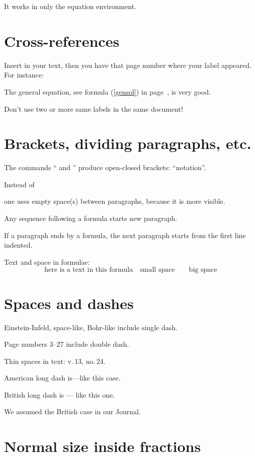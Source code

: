 \documentclass[12pt]{article}
\begin{document}
It works in only the {equation} environment.

\section*{Cross-references}

Insert \label{myidea} in your text, then you have that page number where your label \pageref{myidea} appeared. For instance:

The general equation, see formula (\ref{gensol}) in page~\pageref{gensol}, is very good.

Don't use two or more same labels in the same document!


\section*{Brackets, dividing paragraphs, etc.}

The commands `` and '' produce open-closed brackets: ``notation''.

Instead of \par one uses empty space(s) between paragraphs, because it is more visible.

Any sequence following a formula starts new paragraph.

If a paragraph ends by a formula, the next paragraph starts from the first line indented.

Text and space in formulae:
$$
\mbox{here is a text in this formula}\quad
\mbox{small space}\qquad \mbox{big space}
$$


\section*{Spaces and dashes}

Einstein-Infeld, space-like, Bohr-like include single dash.

Page numbers 3--27 include double dash.

Thin spaces in text: v.\,13, no.\,24.

American long dash is---like this case.

British long dash is --- like this one.

We assumed the British case in our Journal.


\section*{Normal size inside fractions}
\end{document}
